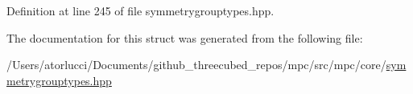 Definition at line 245 of file symmetrygrouptypes.\+hpp.



The documentation for this struct was generated from the following file\+:\begin{DoxyCompactItemize}
\item 
/\+Users/atorlucci/\+Documents/github\+\_\+threecubed\+\_\+repos/mpc/src/mpc/core/\mbox{\hyperlink{symmetrygrouptypes_8hpp}{symmetrygrouptypes.\+hpp}}\end{DoxyCompactItemize}
